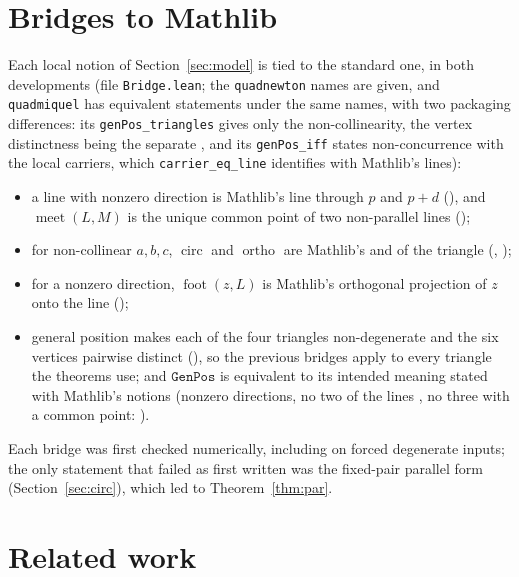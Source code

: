 \documentclass[11pt]{article}
\theoremstyle{definition}
\theoremstyle{remark}
\newcommand{\lean}[1]{\texttt{#1}}
\begin{document}
\section{Bridges to Mathlib}\label{sec:bridges}
Each local notion of Section~\ref{sec:model} is tied to the standard one, in both developments
(file \lean{Bridge.lean}; the \lean{quadnewton} names are given, and \lean{quadmiquel} has
equivalent statements under the same names, with two packaging differences: its
\lean{genPos\_triangles} gives only the non-collinearity, the vertex distinctness being the separate
, and its \lean{genPos\_iff} states non-concurrence with the local
carriers, which \lean{carrier\_eq\_line} identifies with Mathlib's lines):
\begin{itemize}
\item a line with nonzero direction is Mathlib's line through $p$ and $p+d$
(), and $\operatorname{meet}(L,M)$ is the unique common point of two
non-parallel lines ();
\item for non-collinear $a,b,c$, $\operatorname{circ}$ and $\operatorname{ortho}$ are Mathlib's
 and  of the triangle
(, );
\item for a nonzero direction, $\operatorname{foot}(z,L)$ is Mathlib's orthogonal projection of $z$ onto
the line ();
\item general position makes each of the four triangles non-degenerate
and the six vertices pairwise distinct (), so the previous bridges apply to every triangle the theorems
use; and $\lean{GenPos}$ is equivalent to its intended meaning stated with Mathlib's notions (nonzero
directions, no two of the lines , no three with a common point:
).
\end{itemize}
Each bridge was first checked numerically, including on forced degenerate inputs; the only statement
that failed as first written was the fixed-pair parallel form 
(Section~\ref{sec:circ}), which led to Theorem~\ref{thm:par}.

\section{Related work}\label{sec:related}
\end{document}
